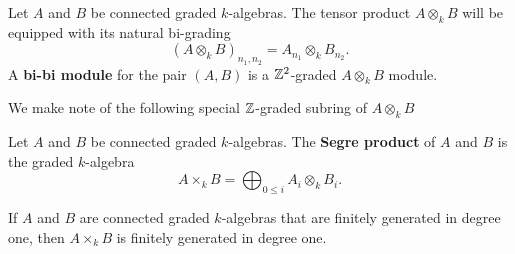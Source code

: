 \begin{definition}
  Let \(A\) and \(B\) be connected graded \(k\)-algebras. The tensor product \(A \otimes_k B\) will be equipped with its natural bi-grading 
  \begin{displaymath}
    (A \otimes_k B)_{n_1,n_2} = A_{n_1} \otimes_k B_{n_2}. 
  \end{displaymath}
  A \textbf{bi-bi module} for the pair \((A,B)\) is a \(\mathbb{Z}^2\)-graded \(A \otimes_k B\) module. 
\end{definition}

We make note of the following special \(\mathbb{Z}\)-graded subring of \(A \otimes_k B\)
\begin{definition}\label{def: segre product}
  Let \(A\) and \(B\) be connected graded \(k\)-algebras.
  The \textbf{Segre product} of \(A\) and \(B\) is the graded \(k\)-algebra
  \[ A \times_k B = \bigoplus_{0 \leq i} A_i \otimes_k B_i.\]
\end{definition}

\begin{proposition}\label{proposition: segre product of generated in degree 1 is generated in degree 1}
  If \(A\) and \(B\) are connected graded \(k\)-algebras that are finitely generated in degree one, then \(A \times_k B\) is finitely generated in degree one.
\end{proposition}

